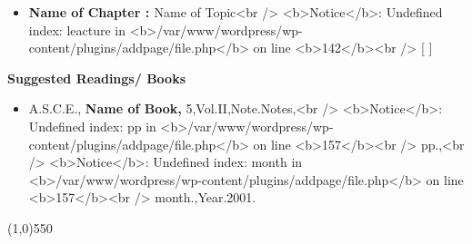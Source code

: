 \documentclass{article}
\begin{document}
\color{black}
\begin{itemize}
\item {\color{black}\large{\bf{Name of Chapter : }}}\color{black}Name of Topic<br />
<b>Notice</b>:  Undefined index: leacture in <b>/var/www/wordpress/wp-content/plugins/addpage/file.php</b> on line <b>142</b><br />
[  ]\end{itemize}
\begin{flushleft}
{\color{black}\bf{Suggested Readings/ Books}}
\end{flushleft}
	
\begin{itemize}
\item  \color{black} A.S.C.E., \textbf{Name of Book,} 5,Vol.II,Note.Notes,<br />
<b>Notice</b>:  Undefined index: pp in <b>/var/www/wordpress/wp-content/plugins/addpage/file.php</b> on line <b>157</b><br />
pp.,<br />
<b>Notice</b>:  Undefined index: month in <b>/var/www/wordpress/wp-content/plugins/addpage/file.php</b> on line <b>157</b><br />
month.,Year.2001.
\end{itemize}
\color{black}\line(1,0){550}
\clearpage
\clearpage
\end{document}
